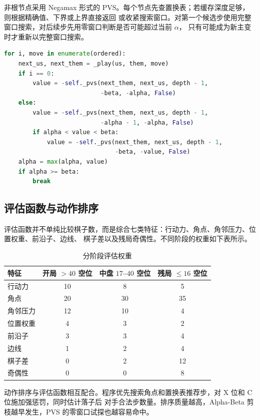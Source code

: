 非根节点采用 Negamax 形式的 PVS。每个节点先查置换表；若缓存深度足够，则根据精确值、下界或上界直接返回
或收紧搜索窗口。对第一个候选步使用完整窗口搜索，对后续步先用零窗口判断是否可能超过当前 $\alpha$，
只有可能成为新主变时才重新以完整窗口搜索。

\begin{lstlisting}[language=Python,caption={PVS 搜索核心}]
for i, move in enumerate(ordered):
    next_us, next_them = _play(us, them, move)
    if i == 0:
        value = -self._pvs(next_them, next_us, depth - 1,
                           -beta, -alpha, False)
    else:
        value = -self._pvs(next_them, next_us, depth - 1,
                           -alpha - 1, -alpha, False)
        if alpha < value < beta:
            value = -self._pvs(next_them, next_us, depth - 1,
                               -beta, -value, False)
    alpha = max(alpha, value)
    if alpha >= beta:
        break
\end{lstlisting}

\subsection{评估函数与动作排序}

评估函数并不单纯比较棋子数，而是综合七类特征：行动力、角点、角邻压力、位置权重、前沿子、边线、
棋子差以及残局奇偶性。不同阶段的权重如下表所示。

\begin{table}[H]
    \centering
    \caption{分阶段评估权重}
    \begin{tabular}{lccc}
        \toprule
        特征 & 开局 $>40$ 空位 & 中盘 $17$--$40$ 空位 & 残局 $\le 16$ 空位 \\
        \midrule
        行动力 & 10 & 8 & 5 \\
        角点 & 20 & 30 & 35 \\
        角邻压力 & 12 & 10 & 4 \\
        位置权重 & 4 & 3 & 2 \\
        前沿子 & 3 & 3 & 4 \\
        边线 & 1 & 2 & 4 \\
        棋子差 & 0 & 2 & 12 \\
        奇偶性 & 0 & 0 & 8 \\
        \bottomrule
    \end{tabular}
\end{table}

动作排序与评估函数相互配合。程序优先搜索角点和置换表推荐步，对 X 位和 C 位施加强惩罚，同时估计落子后
对手合法步数量。排序质量越高，Alpha-Beta 剪枝越早发生，PVS 的零窗口试探也越容易命中。

